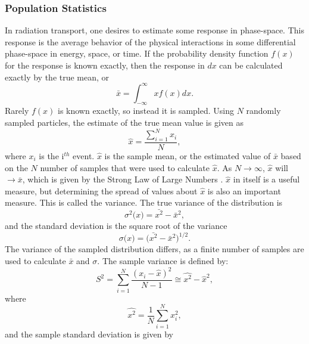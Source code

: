 \subsubsection{Population Statistics}
\label{subsubsec:PopStat}

In radiation transport, one desires to estimate some response in phase-space.
This response is the average behavior of the physical interactions in some
differential phase-space in energy, space, or time. If the probability density
function $f(x)$ for the response is known exactly,
then the response in $dx$ can be calculated exactly by the true
mean, or
\begin{equation}
  \bar{x} = \int_{-\infty}^{\infty} xf(x) dx .
\end{equation}
Rarely $f(x)$ is known
exactly, so instead it is sampled.
Using $N$ randomly sampled particles, the estimate of the true mean value is given as
\begin{equation}
  \hat{x} = \frac{\sum_{i=1}^{N}{x_i}}{N} ,
\end{equation}
where $x_i$ is the i$^{th}$ event. $\hat{x}$ is the sample mean, or the
estimated value of $\bar{x}$
based on the $N$ number of samples that were used to calculate $\hat{x}$. As $N
\rightarrow \infty$, $\hat{x}$ will $\rightarrow \bar{x}$, which is given by the
Strong Law of Large Numbers \cite{mcnp_manual_v1}.
$\hat{x}$ in itself is a useful measure, but determining the spread of values
about $\hat{x}$ is also an important measure. This is called the variance. The
true variance of the distribution is
\begin{equation}
  \sigma^{2}\big( x \big) = \bar{x^2} - \bar{x}^2 ,
\end{equation}
and the standard deviation is the square root of the variance
\begin{equation}
  \sigma\big(x \big) = \big( \bar{x^2} - \bar{x}^2 \big)^{1/2}.
\end{equation}
The variance of the sampled distribution differs, as a finite number of samples
are used to calculate $\bar{x}$ and $\sigma$. The sample variance is defined by:
\begin{equation}
S^{ 2 }=\sum _{ i=1 }^{ N }{ \frac { (x_{ i }-\hat { x } )^{ 2 } }{ N-1 }  }
             \cong \widehat{x^2}-\hat{x}^2 ,
\label{eq:Var}
\end{equation}
where
\begin{equation}
  \widehat{x^2} = \frac{1}{N}\sum_{i=1}^{N} x_i^2 ,
\end{equation}
and the sample standard deviation is given by
